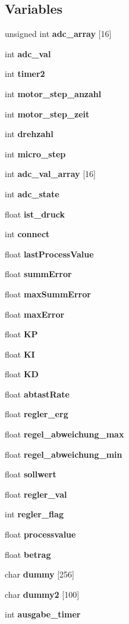 \subsection*{Variables}
\begin{DoxyCompactItemize}
\item 
unsigned int \textbf{ adc\+\_\+array} [16]
\item 
int \textbf{ adc\+\_\+val}
\item 
int \textbf{ timer2}
\item 
int \textbf{ motor\+\_\+step\+\_\+anzahl}
\item 
int \textbf{ motor\+\_\+step\+\_\+zeit}
\item 
int \textbf{ drehzahl}
\item 
int \textbf{ micro\+\_\+step}
\item 
int \textbf{ adc\+\_\+val\+\_\+array} [16]
\item 
int \textbf{ adc\+\_\+state}
\item 
float \textbf{ ist\+\_\+druck}
\item 
int \textbf{ connect}
\item 
float \textbf{ last\+Process\+Value}
\item 
float \textbf{ summ\+Error}
\item 
float \textbf{ max\+Summ\+Error}
\item 
float \textbf{ max\+Error}
\item 
float \textbf{ KP}
\item 
float \textbf{ KI}
\item 
float \textbf{ KD}
\item 
float \textbf{ abtast\+Rate}
\item 
float \textbf{ regler\+\_\+erg}
\item 
float \textbf{ regel\+\_\+abweichung\+\_\+max}
\item 
float \textbf{ regel\+\_\+abweichung\+\_\+min}
\item 
float \textbf{ sollwert}
\item 
float \textbf{ regler\+\_\+val}
\item 
int \textbf{ regler\+\_\+flag}
\item 
float \textbf{ processvalue}
\item 
float \textbf{ betrag}
\item 
char \textbf{ dummy} [256]
\item 
char \textbf{ dummy2} [100]
\item 
int \textbf{ ausgabe\+\_\+timer}
\item 

\end{DoxyCompactItemize}
